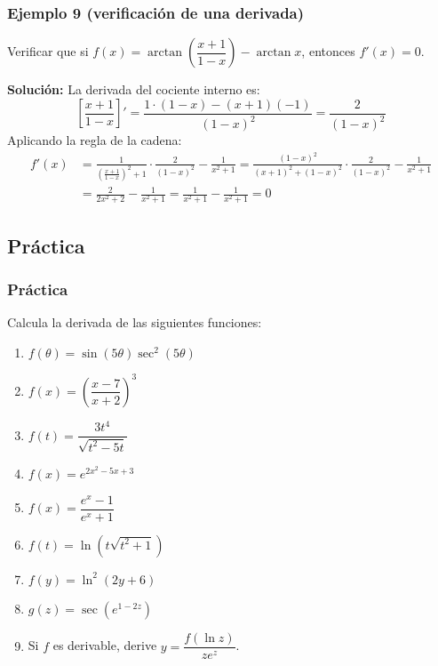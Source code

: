 \documentclass[12pt]{article}
\begin{document}
\subsubsection{Ejemplo 9 (verificación de una derivada)}


Verificar que si $f(x) = \arctan\left(\dfrac{x + 1}{1 - x}\right) - \arctan x$, entonces $f'(x) = 0$.

\textbf{Solución:} La derivada del cociente interno es:
\[
\left[\frac{x + 1}{1 - x}\right]' = \frac{1 \cdot (1 - x) - (x + 1)(-1)}{(1 - x)^2} = \frac{2}{(1 - x)^2}
\]
Aplicando la regla de la cadena:
\begin{align*}
f'(x) &= \frac{1}{\left(\frac{x + 1}{1 - x}\right)^2 + 1} \cdot \frac{2}{(1 - x)^2} - \frac{1}{x^2 + 1}
= \frac{(1 - x)^2}{(x + 1)^2 + (1 - x)^2} \cdot \frac{2}{(1 - x)^2} - \frac{1}{x^2 + 1} \\
&= \frac{2}{2x^2 + 2} - \frac{1}{x^2 + 1} = \frac{1}{x^2 + 1} - \frac{1}{x^2 + 1} = 0
\end{align*}



\subsection{Práctica}

\subsubsection{Práctica}


Calcula la derivada de las siguientes funciones:
\begin{enumerate}
    \item $f(\theta) = \sin(5\theta)\sec^2(5\theta)$
    \item $f(x) = \left(\dfrac{x - 7}{x + 2}\right)^3$
    \item $f(t) = \dfrac{3t^4}{\sqrt{t^2 - 5t}}$
    \item $f(x) = e^{2x^2 - 5x + 3}$
    \item $f(x) = \dfrac{e^x - 1}{e^x + 1}$
    \item $f(t) = \ln\left(t\sqrt{t^2 + 1}\right)$
    \item $f(y) = \ln^2(2y + 6)$
    \item $g(z) = \sec\left(e^{1 - 2z}\right)$
    \item Si $f$ es derivable, derive $y = \dfrac{f(\ln z)}{z e^z}$.
\end{enumerate}
\end{document}
